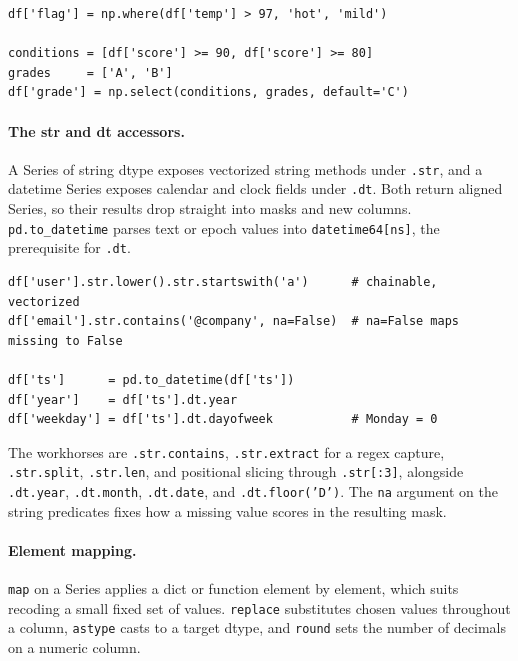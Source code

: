 \begin{lstlisting}[style=python, caption={Two-way and multi-way conditionals without apply}]
df['flag'] = np.where(df['temp'] > 97, 'hot', 'mild')

conditions = [df['score'] >= 90, df['score'] >= 80]
grades     = ['A', 'B']
df['grade'] = np.select(conditions, grades, default='C')
\end{lstlisting}

\vspace{-1ex}

\paragraph{The str and dt accessors.} A Series of string dtype exposes vectorized string methods under \texttt{.str}, and a datetime Series exposes calendar and clock fields under \texttt{.dt}. Both return aligned Series, so their results drop straight into masks and new columns. \texttt{pd.to\_datetime} parses text or epoch values into \texttt{datetime64[ns]}, the prerequisite for \texttt{.dt}.

\begin{lstlisting}[style=python, caption={Vectorized string and datetime work}]
df['user'].str.lower().str.startswith('a')      # chainable, vectorized
df['email'].str.contains('@company', na=False)  # na=False maps missing to False

df['ts']      = pd.to_datetime(df['ts'])
df['year']    = df['ts'].dt.year
df['weekday'] = df['ts'].dt.dayofweek           # Monday = 0
\end{lstlisting}

\vspace{-1ex}

The workhorses are \texttt{.str.contains}, \texttt{.str.extract} for a regex capture, \texttt{.str.split}, \texttt{.str.len}, and positional slicing through \texttt{.str[:3]}, alongside \texttt{.dt.year}, \texttt{.dt.month}, \texttt{.dt.date}, and \texttt{.dt.floor('D')}. The \texttt{na} argument on the string predicates fixes how a missing value scores in the resulting mask.

\paragraph{Element mapping.} \texttt{map} on a Series applies a dict or function element by element, which suits recoding a small fixed set of values. \texttt{replace} substitutes chosen values throughout a column, \texttt{astype} casts to a target dtype, and \texttt{round} sets the number of decimals on a numeric column.

